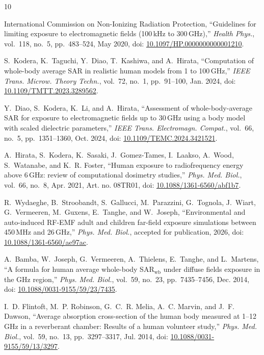 \documentclass[journal,twocolumn,10pt]{IEEEtran}
\newcommand*{\doi}[1]{\href{https://doi.org/#1}{#1}}
\begin{document}
\begin{thebibliography}{10}
\providecommand{\url}[1]{#1}

International Commission on Non-Ionizing Radiation Protection,
  ``Guidelines for limiting exposure to electromagnetic fields
  (100\,kHz to 300\,GHz),'' \emph{Health Phys.}, vol.~118, no.~5,
  pp.~483--524, May 2020, doi: \doi{10.1097/HP.0000000000001210}.

S.~Kodera, K.~Taguchi, Y.~Diao, T.~Kashiwa, and A.~Hirata,
  ``Computation of whole-body average SAR in realistic human models from
  1 to 100\,GHz,'' \emph{IEEE Trans. Microw. Theory Techn.}, vol.~72,
  no.~1, pp.~91--100, Jan. 2024, doi: \doi{10.1109/TMTT.2023.3289562}.

Y.~Diao, S.~Kodera, K.~Li, and A.~Hirata, ``Assessment of
  whole-body-average SAR for exposure to electromagnetic fields up to
  30\,GHz using a body model with scaled dielectric parameters,''
  \emph{IEEE Trans. Electromagn. Compat.}, vol.~66, no.~5,
  pp.~1351--1360, Oct. 2024, doi: \doi{10.1109/TEMC.2024.3421521}.

A.~Hirata, S.~Kodera, K.~Sasaki, J.~Gomez-Tames, I.~Laakso, A.~Wood,
  S.~Watanabe, and K.~R. Foster, ``Human exposure to radiofrequency
  energy above 6\,GHz: review of computational dosimetry studies,''
  \emph{Phys. Med. Biol.}, vol.~66, no.~8, Apr. 2021, Art. no. 08TR01,
  doi: \doi{10.1088/1361-6560/abf1b7}.

R.~Wydaeghe, B.~Stroobandt, S.~Gallucci, M.~Parazzini, G.~Tognola,
  J.~Wiart, G.~Vermeeren, M.~Guxens, E.~Tanghe, and W.~Joseph,
  ``Environmental and auto-induced RF-EMF adult and children far-field
  exposure simulations between 450\,MHz and 26\,GHz,''
  \emph{Phys. Med. Biol.}, accepted for publication, 2026,
  doi: \doi{10.1088/1361-6560/ae97ac}.

A.~Bamba, W.~Joseph, G.~Vermeeren, A.~Thielens, E.~Tanghe, and L.~Martens,
  ``A formula for human average whole-body SAR$_{\mathrm{wb}}$ under diffuse
  fields exposure in the GHz region,'' \emph{Phys. Med. Biol.}, vol.~59,
  no.~23, pp.~7435--7456, Dec. 2014, doi: \doi{10.1088/0031-9155/59/23/7435}.

I.~D. Flintoft, M.~P. Robinson, G.~C.~R. Melia, A.~C. Marvin, and
  J.~F. Dawson, ``Average absorption cross-section of the human body
  measured at 1--12\,GHz in a reverberant chamber: Results of a human
  volunteer study,'' \emph{Phys. Med. Biol.}, vol.~59, no.~13,
  pp.~3297--3317, Jul. 2014, doi: \doi{10.1088/0031-9155/59/13/3297}.


\end{thebibliography}
\end{document}
